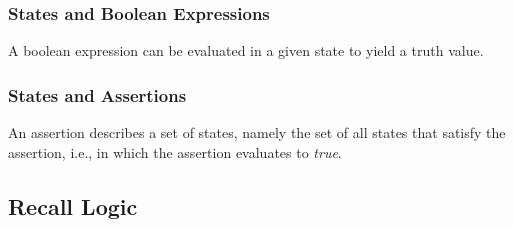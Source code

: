 \begin{multicols}{2}
\subsubsection{States and Boolean Expressions}
A boolean expression can be evaluated in a given state to yield a truth value.

\subsubsection{States and Assertions}
An assertion describes a set of states, namely the set of all states that satisfy the assertion, i.e., in which the assertion evaluates to \textit{true}.

\subsection{Recall Logic}

\end{multicols}
